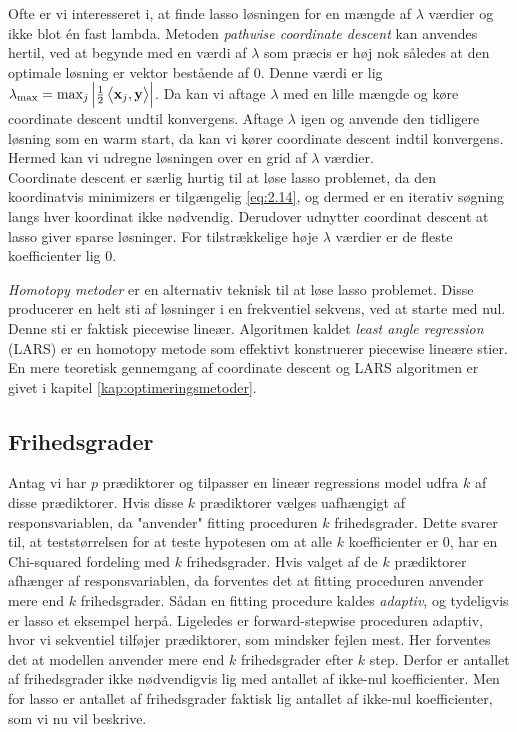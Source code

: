 Ofte er vi interesseret i, at finde lasso løsningen for en mængde af \(\lambda\) værdier og ikke blot én fast lambda.
Metoden \textit{pathwise coordinate descent} kan anvendes hertil, ved at begynde med en værdi af \(\lambda\) som præcis er høj nok således at den optimale løsning er vektor bestående af \(0\).
Denne værdi er lig \(\lambda_{\max}=\max_j \left\vert \frac{1}{2} \left\langle \mathbf{x}_j, \mathbf{y} \right\rangle \right\vert\).
Da kan vi aftage \(\lambda\) med en lille mængde og køre coordinate descent undtil konvergens.
Aftage \(\lambda\) igen og anvende den tidligere løsning som en warm start, da kan vi kører coordinate descent indtil konvergens.
Hermed kan vi udregne løsningen over en grid af \(\lambda\) værdier. \\

Coordinate descent er særlig hurtig til at løse lasso problemet, da den koordinatvis minimizers er tilgængelig \eqref{eq:2.14}, og dermed er en iterativ søgning langs hver koordinat ikke nødvendig.
Derudover udnytter coordinat descent at lasso giver sparse løsninger.
For tilstrækkelige høje \(\lambda\) værdier er de fleste koefficienter lig $0$.

\textit{Homotopy metoder} er en alternativ teknisk til at løse lasso problemet. Disse producerer en helt sti af løsninger i en frekventiel sekvens, ved at starte med nul.
Denne sti er faktisk piecewise lineær.
Algoritmen kaldet \textit{least angle regression} (LARS) er en homotopy metode som effektivt konstruerer piecewise lineære stier.
En mere teoretisk gennemgang af coordinate descent og LARS algoritmen er givet i kapitel \ref{kap:optimeringsmetoder}.
%
\subsection{Frihedsgrader}
Antag vi har \(p\) prædiktorer og tilpasser en lineær regressions model udfra \(k\) af disse prædiktorer.
Hvis disse \(k\) prædiktorer vælges uafhængigt af responsvariablen, da "anvender" fitting proceduren \(k\) frihedsgrader.
Dette svarer til, at teststørrelsen for at teste hypotesen om at alle \(k\) koefficienter er 0, har en Chi-squared fordeling med \(k\) frihedsgrader.
%
Hvis valget af de \(k\) prædiktorer afhænger af responsvariablen, da forventes det at fitting proceduren anvender mere end \(k\) frihedsgrader. 
Sådan en fitting procedure kaldes \textit{adaptiv}, og tydeligvis er lasso et eksempel herpå.
Ligeledes er forward-stepwise proceduren adaptiv, hvor vi sekventiel tilføjer prædiktorer, som mindsker fejlen mest.
Her forventes det at modellen anvender mere end \(k\) frihedsgrader efter \(k\) step.
Derfor er antallet af frihedsgrader ikke nødvendigvis lig med antallet af ikke-nul koefficienter.
Men for lasso er antallet af frihedsgrader faktisk lig antallet af ikke-nul koefficienter, som vi nu vil beskrive.

